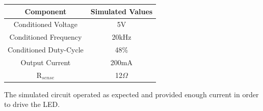 \begin{tabular}{|c|c|}
	\caption{Simulated Results}
	\label{tab:simresults}
	\hline 
	Component & Simulated Values \\ 
	\hline 
	Conditioned Voltage & 5V \\ 
	\hline 
	Conditioned Frequency & 20kHz \\ 
	\hline 
	Conditioned Duty-Cycle & 48\% \\ 
	\hline 
	Output Current & 200mA \\ 
	\hline 
	R$_{sense}$ & 12$\Omega$ \\ 
	\hline 
\end{tabular} 

The simulated circuit operated as expected and provided enough current in order to drive the LED.
	






